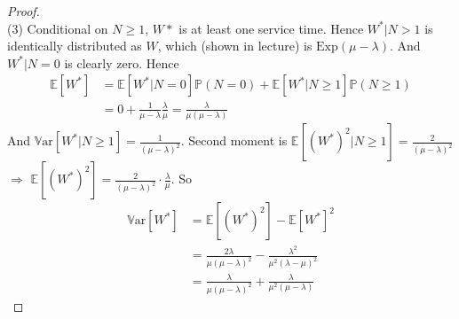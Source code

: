 \documentclass[a4paper, 10pt]{article}
\theoremstyle{definition}
\theoremstyle{hSol}
\begin{document}
\begin{proof}
~\\
(3) Conditional on $N\geq 1$, $W*$ is at least one service time. Hence $W^*|N>1$ is identically distributed as $W$, which (shown in lecture) is $\text{Exp}(\mu-\lambda)$. And $W^*|N=0$ is clearly zero. Hence
\begin{equation}
  \begin{split}
    \mathbb{E}\left[W^*\right] &= \mathbb{E}\left[W^*|N=0\right]\mathbb{P}\left(N=0\right) + \mathbb{E}\left[W^*|N\geq 1\right]\mathbb{P}\left(N\geq 1\right) \\
    &= 0 + \frac{1}{\mu-\lambda}\frac{\lambda}{\mu} = \frac{\lambda}{\mu(\mu-\lambda)}
  \end{split}
\end{equation}
And $\mathrm{\mathbb{V}ar}\left[W^*|N\geq 1\right] =\frac{1}{(\mu- \lambda)^2}$. Second moment is $\mathbb{E}\left[(W^*)^2|N\geq 1\right]=\frac{2}{(\mu- \lambda)^2}$ $\Rightarrow$ $\mathbb{E}\left[(W^*)^2\right]=\frac{2}{(\mu- \lambda)^2}\cdot \frac{\lambda}{\mu}$. So
\begin{equation}
  \begin{split}
    \mathrm{\mathbb{V}ar}\left[W^*\right] &= \mathbb{E}\left[(W^*)^2\right] - \mathbb{E}\left[W^*\right]^2 \\
    &= \frac{2\lambda}{\mu(\mu- \lambda)^2} - \frac{\lambda^2}{\mu^2(\lambda-\mu)^2} \\
    & = \frac{\lambda}{\mu(\mu- \lambda)^2} + \frac{\lambda}{\mu^2(\mu- \lambda)}
  \end{split}
\end{equation}
\end{proof}
\end{document}
